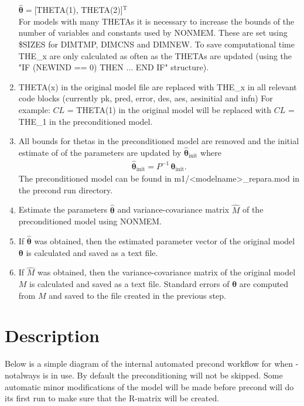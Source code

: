 \begin{enumerate}
        \indent $\hat{\boldsymbol{\theta}}=$[THETA(1), THETA(2)]$^\textrm{T}$\\
        For models with many THETAs it is necessary to increase the bounds of the number of variables and constants used by NONMEM. These are set using \$SIZES for DIMTMP, DIMCNS and DIMNEW. To save computational time THE\_x are only calculated as often as the THETAs are updated (using the "IF (NEWIND == 0) THEN ... END IF" structure).
    \item THETA(x) in the original model file are replaced with THE\_x in all relevant code blocks (currently pk, pred, error, des, aes, aesinitial and infn)
        For example: $CL$ = THETA(1) in the original model will be replaced with $CL$ = THE\_1 in the preconditioned model.

	\item All bounds for thetas in the preconditioned model are removed and the initial estimate of of the parameters are updated by $\hat{\boldsymbol{\theta}}_\textrm{init}$ where
	\begin{eqnarray*}
	    \hat{\boldsymbol{\theta}}_\textrm{init}= P^{-1} \,{\boldsymbol{\theta}}_\textrm{init}.
	\end{eqnarray*}
	The preconditioned model can be found in m1/<modelname>\_repara.mod in the precond run directory.
	\item Estimate the parameters $\hat{\boldsymbol{\theta}}$ and variance-covariance matrix $\hat{M}$ of the preconditioned model using NONMEM.
	\item If $\hat{\boldsymbol{\theta}}$ was obtained, then the estimated parameter vector of the original model $\boldsymbol{\theta}$ is calculated and saved as a text file.
	\item If $\hat{M}$ was obtained, then the variance-covariance matrix of the original model $M$ is calculated and saved as a text file. Standard errors of $\boldsymbol{\theta}$ are computed from $M$ and saved to the file created in the previous step.
\end{enumerate}



\section{Description}

Below is a simple diagram of the internal automated precond workflow for when -notalways is in use. By default the preconditioning will not be skipped. Some automatic minor modifications of the model will be made before precond will do its first run to make sure that the R-matrix will be created.

